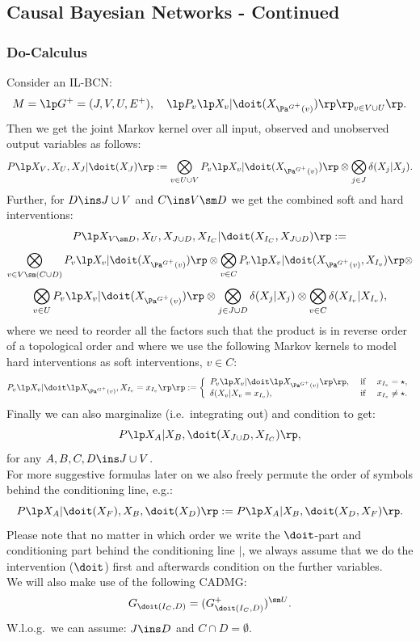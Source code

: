 \subsection*{Causal Bayesian Networks - Continued}
\subsubsection{Do-Calculus}

\begin{Rem}[Recap]
    \label{rem-bcn-notation}
    Consider an IL-BCN:
    \[ M = \lp G^+=(J,V,U,E^+),\quad \lp P_v\lp X_v|\doit(X_{\Pa^{G^+}(v)})   \rp\rp_{v\in V \cup U} \rp. \]
        Then we get the joint  Markov kernel over all input, observed and unobserved output variables as follows:
        \[ P\lp X_V,X_U,X_J|\doit(X_J) \rp := \bigotimes_{v \in U \cup V} P_v\lp X_v|\doit(X_{\Pa^{G^+}(v)})\rp \otimes 
        \bigotimes_{j \in J} \delta(X_j|X_j).\]
    Further, for $D \ins J \cup V$ and $C \ins V \sm D$ we get the combined soft and hard interventions:
    \[ P\lp X_{V \sm D},X_U,X_{J \cup D},X_{I_C}| \doit(X_{I_C},X_{J \cup D}) \rp :=\] 
    \[    \bigotimes_{v \in V \sm (C \cup D)} P_v\lp X_v|\doit(X_{\Pa^{G^+}(v)})\rp \otimes 
    \bigotimes_{v \in C} P_v\lp X_v|\doit(X_{\Pa^{G^+}(v)},X_{I_v})\rp \otimes \]
     \[   \bigotimes_{v \in U} P_v\lp X_v|\doit(X_{\Pa^{G^+}(v)})\rp \otimes 
     \bigotimes_{j \in J \cup D} \delta(X_j|X_j) \otimes\bigotimes_{v \in C} \delta(X_{I_v}|X_{I_v})  ,\]
       where we need to reorder all the factors such that the product is in reverse order of a topological order and 
       where we use the following Markov kernels to model hard interventions as  soft interventions, $v\in C$: 
       \[ P_v\lp X_v|\doit\lp X_{\Pa^{G^+}(v)},X_{I_v}=x_{I_v}\rp\rp := 
         \left\{ \begin{array}{lll}
                 P_v\lp X_v|\doit\lp X_{\Pa^{G^+}(v)}\rp\rp, & \text{ if } & x_{I_v} = \star, \\
    \delta(X_v|X_v =x_{I_v}),  & \text{ if } & x_{I_v} \neq \star. 
                \end{array}\right.\]
  Finally we can also marginalize (i.e.\ integrating out) and condition to get: 
  \[ P\lp X_A|X_B, \doit(X_{J \cup D},X_{I_C}) \rp ,\]
for any $A,B,C,D \ins J \cup V$.\\
For more suggestive formulas later on we also freely permute the order of symbols behind the conditioning line, e.g.:
\[ P\lp X_A|\doit(X_F),X_B, \doit(X_D) \rp := P\lp X_A|X_B, \doit(X_D,X_F) \rp.\]
Please note that no matter in which order we write the $\doit$-part and conditioning part behind the conditioning line $|$, we always assume that we do the intervention ($\doit$) first and afterwards condition on the further variables.\\
We will also make use of the following CADMG:
\[ G_{\doit(I_C,D)} = (G^+_{\doit(I_C,D)})^{\sm U}.  \]
 W.l.o.g.\ we can assume: $J \ins D$ and %
$C \cap D = \emptyset$.
\end{Rem}

